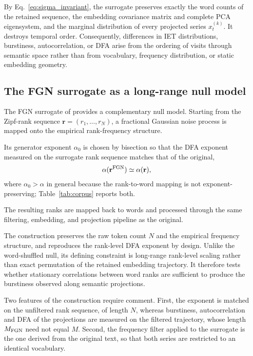 \documentclass[preprint]{elsarticle}
\newcommand{\xtk}{x_t^{(k)}}
\begin{document}
By Eq.~\eqref{eq:sigma_invariant}, the surrogate preserves exactly the
word counts of the retained sequence, the embedding covariance matrix
and complete PCA eigensystem, and the marginal distribution of every
projected series $\xtk$.
It destroys temporal order.
Consequently, differences in IET distributions, burstiness,
autocorrelation, or DFA arise from the ordering of visits through
semantic space rather than from vocabulary, frequency distribution, or
static embedding geometry.

\subsection{The FGN surrogate as a long-range null model}
\label{sec:null_model_fgn}

The FGN surrogate of \citet{DegliEsposti2025} provides a complementary
null model.
Starting from the Zipf-rank sequence
$\mathbf{r}=(r_1,\ldots,r_N)$, a fractional Gaussian noise process is
mapped onto the empirical rank-frequency structure.

Its generator exponent $\alpha_0$ is chosen by bisection so that the DFA
exponent measured on the surrogate rank sequence matches that of the
original,
\begin{equation}
  \alpha(\mathbf{r}^{\rm FGN})\simeq\alpha(\mathbf{r}),
  \label{eq:fgn_dfa_match}
\end{equation}
where $\alpha_0>\alpha$ in general because the rank-to-word mapping is
not exponent-preserving; Table~\ref{tab:corpus} reports both.


The resulting ranks are mapped back to words and processed through the
same filtering, embedding, and projection pipeline as the original.

The construction preserves the raw token count $N$ and the empirical
frequency structure, and reproduces the rank-level DFA exponent by
design.
Unlike the word-shuffled null, its defining constraint is long-range
rank-level scaling rather than exact permutation of the retained
embedding trajectory.
It therefore tests whether stationary correlations between word ranks
are sufficient to produce the burstiness observed along semantic
projections.

Two features of the construction require comment.
First, the exponent is matched on the unfiltered rank sequence, of
length $N$, whereas burstiness, autocorrelation and DFA of the
projections are measured on the filtered trajectory, whose length
$M_{\rm FGN}$ need not equal $M$.
Second, the frequency filter applied to the surrogate is the one derived
from the original text, so that both series are restricted to an
identical vocabulary.
\end{document}
